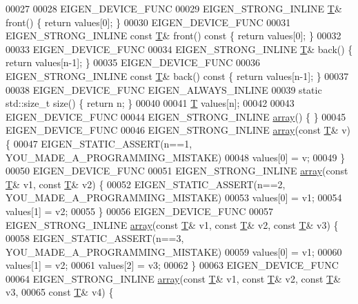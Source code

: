 \begin{DoxyCode}
00027 
00028   EIGEN\_DEVICE\_FUNC
00029   EIGEN\_STRONG\_INLINE \hyperlink{group___sparse_core___module}{T}& front() \{ \textcolor{keywordflow}{return} values[0]; \}
00030   EIGEN\_DEVICE\_FUNC
00031   EIGEN\_STRONG\_INLINE \textcolor{keyword}{const} \hyperlink{group___sparse_core___module}{T}& front()\textcolor{keyword}{ const }\{ \textcolor{keywordflow}{return} values[0]; \}
00032 
00033   EIGEN\_DEVICE\_FUNC
00034   EIGEN\_STRONG\_INLINE \hyperlink{group___sparse_core___module}{T}& back() \{ \textcolor{keywordflow}{return} values[n-1]; \}
00035   EIGEN\_DEVICE\_FUNC
00036   EIGEN\_STRONG\_INLINE \textcolor{keyword}{const} \hyperlink{group___sparse_core___module}{T}& back()\textcolor{keyword}{ const }\{ \textcolor{keywordflow}{return} values[n-1]; \}
00037 
00038   EIGEN\_DEVICE\_FUNC EIGEN\_ALWAYS\_INLINE
00039   \textcolor{keyword}{static} std::size\_t size() \{ \textcolor{keywordflow}{return} n; \}
00040 
00041   \hyperlink{group___sparse_core___module}{T} values[n];
00042 
00043   EIGEN\_DEVICE\_FUNC
00044   EIGEN\_STRONG\_INLINE \hyperlink{class_eigen_1_1array}{array}() \{ \}
00045   EIGEN\_DEVICE\_FUNC
00046   EIGEN\_STRONG\_INLINE \hyperlink{class_eigen_1_1array}{array}(\textcolor{keyword}{const} \hyperlink{group___sparse_core___module}{T}& v) \{
00047     EIGEN\_STATIC\_ASSERT(n==1, YOU\_MADE\_A\_PROGRAMMING\_MISTAKE)
00048     values[0] = v;
00049   \}
00050   EIGEN\_DEVICE\_FUNC
00051   EIGEN\_STRONG\_INLINE \hyperlink{class_eigen_1_1array}{array}(\textcolor{keyword}{const} \hyperlink{group___sparse_core___module}{T}& v1, \textcolor{keyword}{const} \hyperlink{group___sparse_core___module}{T}& v2) \{
00052     EIGEN\_STATIC\_ASSERT(n==2, YOU\_MADE\_A\_PROGRAMMING\_MISTAKE)
00053     values[0] = v1;
00054     values[1] = v2;
00055   \}
00056   EIGEN\_DEVICE\_FUNC
00057   EIGEN\_STRONG\_INLINE \hyperlink{class_eigen_1_1array}{array}(\textcolor{keyword}{const} \hyperlink{group___sparse_core___module}{T}& v1, \textcolor{keyword}{const} \hyperlink{group___sparse_core___module}{T}& v2, \textcolor{keyword}{const} \hyperlink{group___sparse_core___module}{T}& v3) \{
00058     EIGEN\_STATIC\_ASSERT(n==3, YOU\_MADE\_A\_PROGRAMMING\_MISTAKE)
00059     values[0] = v1;
00060     values[1] = v2;
00061     values[2] = v3;
00062   \}
00063   EIGEN\_DEVICE\_FUNC
00064   EIGEN\_STRONG\_INLINE \hyperlink{class_eigen_1_1array}{array}(\textcolor{keyword}{const} \hyperlink{group___sparse_core___module}{T}& v1, \textcolor{keyword}{const} \hyperlink{group___sparse_core___module}{T}& v2, \textcolor{keyword}{const} \hyperlink{group___sparse_core___module}{T}& v3,
00065                             \textcolor{keyword}{const} \hyperlink{group___sparse_core___module}{T}& v4) \{

\end{DoxyCode}
